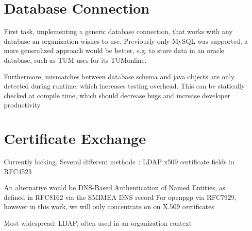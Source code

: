 \section{Database Connection}\label{sec:databaseConnection}
First task, implementing a generic database connection, that works with any database an organization wishes to use.
Previously only MySQL was supported, a more generalized approach would be better, e.g. to store data in an oracle
database, such as TUM uses for its TUMonline.

Furthermore, mismatches between database schema and java objects are only detected during runtime, which increases
testing overhead.
This can be statically checked at compile time, which should decrease bugs and increase developer productivity

\section{Certificate Exchange}\label{sec:certificateExchange}
Currently lacking.
Several different methods~\cite{hauner2016interoperability}:
LDAP x509 certificate fields in RFC4523~\cite{RFC4523}


An alternative would be DNS-Based Authentication of Named Entities, as defined in RFC8162 via the SMIMEA DNS record
For openpgp via RFC7929, however in this work, we will only concentrate on on X.509 certificates

Most widespread: LDAP, often used in an organization context
